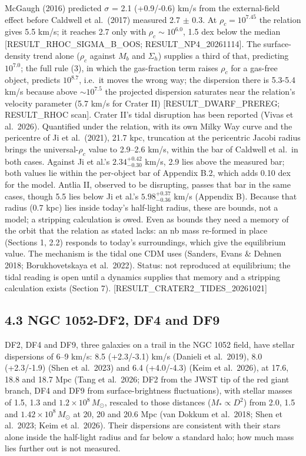 \documentclass[
  10pt,
]{article}
\begin{document}
McGaugh (2016) predicted $\sigma$ = 2.1 (+0.9/-0.6) km/s from the external-field effect before Caldwell et al.~(2017) measured 2.7 $\pm$ 0.3. At $\rho_c=10^{7.45}$ the relation gives 5.5 km/s; it reaches 2.7 only with $\rho_c\sim 10^{6.0}$, 1.5 dex below the median {[}RESULT\_RHOC\_SIGMA\_B\_OOS; RESULT\_NP4\_20261114{]}. The surface-density trend alone ($\rho_c$ against $M_b$ and $\Sigma_h$) supplies a third of that, predicting $10^{7.0}$; the full rule (3), in which the gas-fraction term raises $\rho_c$ for a gas-free object, predicts $10^{8.7}$, i.e.\ it moves the wrong way; the dispersion there is 5.3-5.4 km/s because above $\sim 10^{7.5}$ the projected dispersion saturates near the relation's velocity parameter (5.7 km/s for Crater II) {[}RESULT\_DWARF\_PREREG; RESULT\_RHOC scan{]}. Crater II's tidal disruption has been reported (Vivas et al.~2026). Quantified under the relation, with its own Milky Way curve and the pericentre of Ji et al.~(2021), 21.7 kpc, truncation at the pericentric Jacobi radius brings the universal-$\rho_c$ value to 2.9--2.6 km/s, within the bar of Caldwell et al.\ in both cases. Against Ji et al.'s $2.34^{+0.42}_{-0.30}$ km/s, 2.9 lies above the measured bar; both values lie within the per-object bar of Appendix B.2, which adds 0.10 dex for the model. Antlia II, observed to be disrupting, passes that bar in the same cases, though 5.5 lies below Ji et al.'s $5.98^{+0.37}_{-0.36}$ km/s (Appendix B). Because that radius (0.7 kpc) lies inside today's half-light radius, these are bounds, not a model; a stripping calculation is owed. Even as bounds they need a memory of the orbit that the relation as stated lacks: an nb mass re-formed in place (Sections 1, 2.2) responds to today's surroundings, which give the equilibrium value. The mechanism is the tidal one CDM uses (Sanders, Evans \& Dehnen 2018; Borukhovetskaya et al.~2022). Status: not reproduced at equilibrium; the tidal reading is open until a dynamics supplies that memory and a stripping calculation exists (Section 7). {[}RESULT\_CRATER2\_TIDES\_20261021{]}

\subsection{4.3 NGC 1052-DF2, DF4 and DF9}

DF2, DF4 and DF9, three galaxies on a trail in the NGC 1052 field, have stellar dispersions of 6--9 km/s: 8.5 (+2.3/-3.1) km/s (Danieli et al.~2019), 8.0 (+2.3/-1.9) (Shen et al.~2023) and 6.4 (+4.0/-4.3) (Keim et al.~2026), at 17.6, 18.8 and 18.7 Mpc (Tang et al.~2026; DF2 from the JWST tip of the red giant branch, DF4 and DF9 from surface-brightness fluctuations), with stellar masses of 1.5, 1.3 and $1.2\times10^8\,M_\odot$, rescaled to those distances ($M_*\propto D^2$) from 2.0, 1.5 and $1.42\times10^8\,M_\odot$ at 20, 20 and 20.6 Mpc (van Dokkum et al.~2018; Shen et al.~2023; Keim et al.~2026). Their dispersions are consistent with their stars alone inside the half-light radius and far below a standard halo; how much mass lies further out is not measured.
\end{document}
